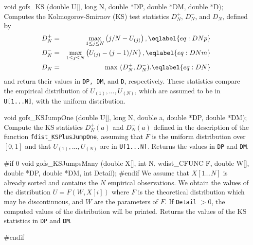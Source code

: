 void gofs_KS (double U[], long N, double *DP, double *DM, double *D);
\endcode
\tab Computes the Kolmogorov-Smirnov (KS) test statistics 
 $D_N^+$, $D_N^-$, and $D_N$, defined by
 \begin {eqnarray}
  D_N^+ &=& \max_{1\le j\le N} \left(j/N - U_{(j)}\right), 
                                                    \eqlabel{eq:DNp} \\
  D_N^- &=& \max_{1\le j\le N} \left(U_{(j)} - (j-1)/N\right), 
                                                    \eqlabel{eq:DNm} \\
  D_N   &=& \max\ (D_N^+, D_N^-).                   \eqlabel{eq:DN}
 \end {eqnarray}
 and return their values in  {\tt DP, DM}, and {\tt D}, respectively.
 These statistics compare the empirical distribution of 
 $U_{(1)},\dots,U_{(N)}$, which are assumed to be in {\tt U[1...N]},
 with the uniform distribution.
\endtab
\code


void gofs_KSJumpOne (double U[], long N, double a, double *DP, double *DM);
\endcode
\tab Compute the KS statistics $D_N^+(a)$ and $D_N^-(a)$ defined in the 
  description of the function 
{\tt fdist\_KSPlusJumpOne}, assuming that $F$ is the
  uniform distribution over $[0,1]$ and that
  $U_{(1)},\dots,U_{(N)}$ are in {\tt U[1...N]}.
  Returns the values in {\tt DP} and {\tt DM}.
 \endtab
\hide%

\code
#if 0
void gofs_KSJumpsMany (double X[], int N, wdist_CFUNC F, double W[],
                       double *DP, double *DM, int Detail);
#endif
\endcode
\tab We assume that $X[1...N]$ is already sorted and contains the
 $N$ empirical observations. We obtain the values of the distribution
 $U =  F(W, X[i])$ where $F$ is the theoretical
 distribution which may be discontinuous, and $W$ are the parameters
 of $F$. If {\tt Detail} $> 0$, the computed values of the
 distribution will be printed.
 Returns the values of the KS statistics in {\tt DP} and {\tt DM}.
 \endtab
\endhide%

\code
\hide
#endif
\endhide
\endcode
